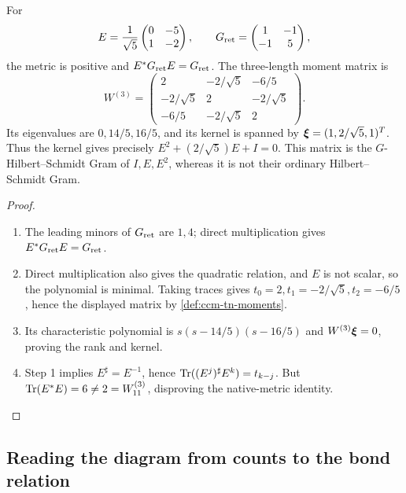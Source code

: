 \begin{proposition}
\label{prop:ccm-tn-pauli}
For
\[
 E=\frac1{\sqrt5}\begin{pmatrix}0&-5\\1&-2\end{pmatrix},\qquad
 G_{\mathrm{ret}}=\begin{pmatrix}1&-1\\-1&5\end{pmatrix},
\]
the metric is positive and $E^*G_{\mathrm{ret}} E=G_{\mathrm{ret}}$. The three-length
moment matrix is
\[
 W^{(3)}=\begin{pmatrix}
 2&-2/\sqrt5&-6/5\\
 -2/\sqrt5&2&-2/\sqrt5\\
 -6/5&-2/\sqrt5&2
 \end{pmatrix}.
\]
Its eigenvalues are $0,14/5,16/5$, and its kernel is spanned by
$\boldsymbol{\xi}=(1,2/\sqrt5,1)^T$. Thus the kernel gives precisely
$E^2+(2/\sqrt5)E+I=0$. This matrix is the $G$-Hilbert--Schmidt Gram of
$I,E,E^2$, whereas it is not their ordinary Hilbert--Schmidt Gram.
\end{proposition}
\begin{proof}
\begin{enumerate}
\item[$\langle1\rangle$1.] The leading minors of $G_{\mathrm{ret}}$ are $1,4$;
direct multiplication gives $E^*G_{\mathrm{ret}} E=G_{\mathrm{ret}}$.
\item[$\langle1\rangle$2.] Direct multiplication also gives the quadratic
relation, and $E$ is not scalar, so the polynomial is minimal. Taking
traces gives $t_0=2,t_1=-2/\sqrt5,t_2=-6/5$, hence the displayed matrix
by \cref{def:ccm-tn-moments}.
\item[$\langle1\rangle$3.] Its characteristic polynomial is
$s(s-14/5)(s-16/5)$ and $W^{(3)}\boldsymbol{\xi}=0$, proving the rank and kernel.
\item[$\langle1\rangle$4.] Step 1 implies $E^\sharp=E^{-1}$, hence
$\operatorname{Tr}((E^j)^\sharp E^k)=t_{k-j}$. But
$\operatorname{Tr}(E^*E)=6\ne2=W^{(3)}_{11}$, disproving the native-metric identity.
\end{enumerate}
\end{proof}

\subsection{Reading the diagram from counts to the bond relation}

